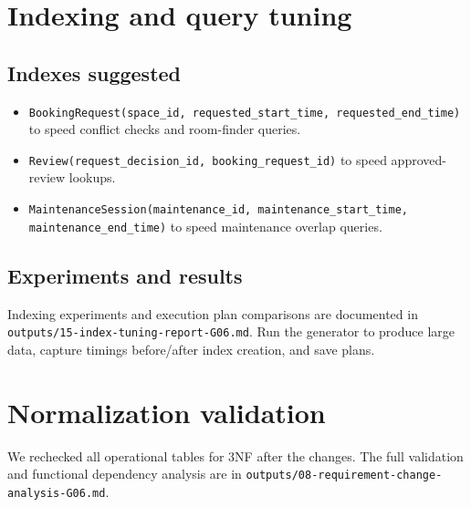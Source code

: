 \documentclass[12pt,a4paper]{article}
\begin{document}
\section{Indexing and query tuning}
\subsection{Indexes suggested}
\begin{itemize}[nosep]
  \item \texttt{BookingRequest(space\_id, requested\_start\_time, requested\_end\_time)} to speed conflict checks and room-finder queries.
  \item \texttt{Review(request\_decision\_id, booking\_request\_id)} to speed approved-review lookups.
  \item \texttt{MaintenanceSession(maintenance\_id, maintenance\_start\_time, maintenance\_end\_time)} to speed maintenance overlap queries.
\end{itemize}

\subsection{Experiments and results}
Indexing experiments and execution plan comparisons are documented in \texttt{outputs/15-index-tuning-report-G06.md}. Run the generator to produce large data, capture timings before/after index creation, and save plans.

\section{Normalization validation}
We rechecked all operational tables for 3NF after the changes. The full validation and functional dependency analysis are in \texttt{outputs/08-requirement-change-analysis-G06.md}.
\end{document}

